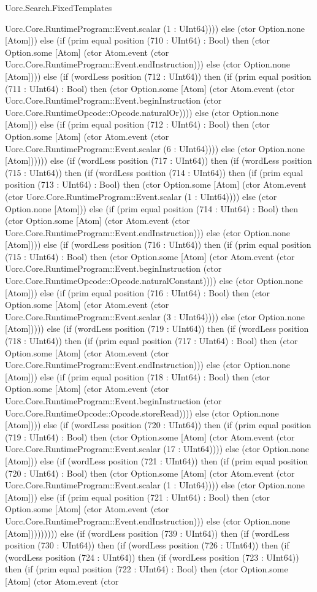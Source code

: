 \begin{lexlean}{Uorc.Search.FixedTemplates}
\begin{semanticmodule}
{Uorc.Core.RuntimeProgram::Event.scalar (1 : UInt64)))) else (ctor Option.none [Atom])) else (if (prim equal position (710 : UInt64) : Bool) then (ctor Option.some [Atom] (ctor Atom.event (ctor Uorc.Core.RuntimeProgram::Event.endInstruction))) else (ctor Option.none [Atom]))) else (if (wordLess position (712 : UInt64)) then (if (prim equal position (711 : UInt64) : Bool) then (ctor Option.some [Atom] (ctor Atom.event (ctor Uorc.Core.RuntimeProgram::Event.beginInstruction (ctor Uorc.Core.RuntimeOpcode::Opcode.naturalOr)))) else (ctor Option.none [Atom])) else (if (prim equal position (712 : UInt64) : Bool) then (ctor Option.some [Atom] (ctor Atom.event (ctor Uorc.Core.RuntimeProgram::Event.scalar (6 : UInt64)))) else (ctor Option.none [Atom]))))) else (if (wordLess position (717 : UInt64)) then (if (wordLess position (715 : UInt64)) then (if (wordLess position (714 : UInt64)) then (if (prim equal position (713 : UInt64) : Bool) then (ctor Option.some [Atom] (ctor Atom.event (ctor Uorc.Core.RuntimeProgram::Event.scalar (1 : UInt64)))) else (ctor Option.none [Atom])) else (if (prim equal position (714 : UInt64) : Bool) then (ctor Option.some [Atom] (ctor Atom.event (ctor Uorc.Core.RuntimeProgram::Event.endInstruction))) else (ctor Option.none [Atom]))) else (if (wordLess position (716 : UInt64)) then (if (prim equal position (715 : UInt64) : Bool) then (ctor Option.some [Atom] (ctor Atom.event (ctor Uorc.Core.RuntimeProgram::Event.beginInstruction (ctor Uorc.Core.RuntimeOpcode::Opcode.naturalConstant)))) else (ctor Option.none [Atom])) else (if (prim equal position (716 : UInt64) : Bool) then (ctor Option.some [Atom] (ctor Atom.event (ctor Uorc.Core.RuntimeProgram::Event.scalar (3 : UInt64)))) else (ctor Option.none [Atom])))) else (if (wordLess position (719 : UInt64)) then (if (wordLess position (718 : UInt64)) then (if (prim equal position (717 : UInt64) : Bool) then (ctor Option.some [Atom] (ctor Atom.event (ctor Uorc.Core.RuntimeProgram::Event.endInstruction))) else (ctor Option.none [Atom])) else (if (prim equal position (718 : UInt64) : Bool) then (ctor Option.some [Atom] (ctor Atom.event (ctor Uorc.Core.RuntimeProgram::Event.beginInstruction (ctor Uorc.Core.RuntimeOpcode::Opcode.storeRead)))) else (ctor Option.none [Atom]))) else (if (wordLess position (720 : UInt64)) then (if (prim equal position (719 : UInt64) : Bool) then (ctor Option.some [Atom] (ctor Atom.event (ctor Uorc.Core.RuntimeProgram::Event.scalar (17 : UInt64)))) else (ctor Option.none [Atom])) else (if (wordLess position (721 : UInt64)) then (if (prim equal position (720 : UInt64) : Bool) then (ctor Option.some [Atom] (ctor Atom.event (ctor Uorc.Core.RuntimeProgram::Event.scalar (1 : UInt64)))) else (ctor Option.none [Atom])) else (if (prim equal position (721 : UInt64) : Bool) then (ctor Option.some [Atom] (ctor Atom.event (ctor Uorc.Core.RuntimeProgram::Event.endInstruction))) else (ctor Option.none [Atom])))))))) else (if (wordLess position (739 : UInt64)) then (if (wordLess position (730 : UInt64)) then (if (wordLess position (726 : UInt64)) then (if (wordLess position (724 : UInt64)) then (if (wordLess position (723 : UInt64)) then (if (prim equal position (722 : UInt64) : Bool) then (ctor Option.some [Atom] (ctor Atom.event (ctor }
\end{semanticmodule}
\end{lexlean}
